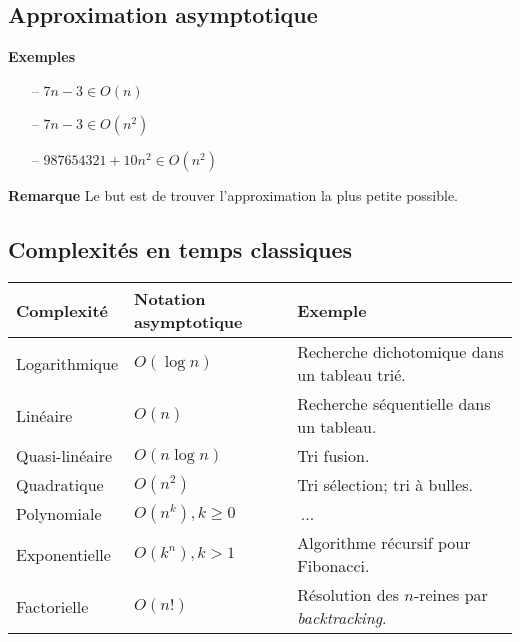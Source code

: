 

\subsection{Approximation asymptotique}

\textbf{Exemples}
\begin{itemize}
\item[--] $7n-3 \in O(n)$
\item[--] $7n-3 \in O(n^2)$
\item[--] $987654321 + 10n^2 \in O(n^2)$
\end{itemize}

\noindent
\textbf{Remarque}
Le but est de trouver l'approximation la plus petite possible.


\subsection{Complexités en temps classiques}
\begin{tabular}{|l|l|l|}
  \hline
  \textbf{Complexité} & \textbf{Notation asymptotique} & \textbf{Exemple} \\
  \hline
  Logarithmique 	& $O(\log n)$			& Recherche dichotomique dans un tableau trié. \\
  \hline
  Linéaire 		& $O(n)$ 				& Recherche séquentielle dans un tableau. \\
  \hline
  Quasi-linéaire  & $O(n \log n)$ 		& Tri fusion. \\
  \hline
  Quadratique 	& $O(n^2)$ 			& Tri sélection; tri à bulles.\\
  \hline
  Polynomiale 	& $O(n^k), k\geq 0$	& $~$... \\
  \hline
  Exponentielle 	& $O(k^n), k>1$ 		& Algorithme récursif pour Fibonacci. \\
  \hline
  Factorielle 	& $O(n!)$ 			& Résolution des $n$-reines par \textit{backtracking}. \\
  \hline
\end{tabular}

